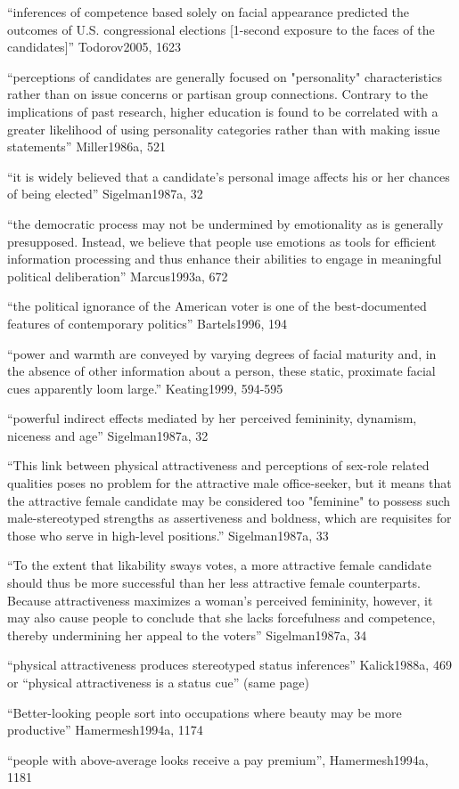 

``inferences of competence based solely on facial appearance predicted the outcomes of U.S. congressional elections [1-second exposure to the faces of the candidates]'' Todorov2005, 1623

``perceptions of candidates are generally focused on "personality" characteristics rather than on issue concerns or partisan group connections. Contrary to the implications of past research, higher education is found to be correlated with a greater likelihood of using personality categories rather than with making issue statements'' Miller1986a, 521

``it is widely believed that a candidate's personal image affects his or her chances of being elected'' Sigelman1987a, 32

``the democratic process may not be undermined by emotionality as is generally presupposed. Instead, we believe that people use emotions as tools for efficient information processing and thus enhance their abilities to engage in meaningful political deliberation'' Marcus1993a, 672

``the political ignorance of the American voter is one of the best-documented features of contemporary politics'' Bartels1996, 194

``power and warmth are conveyed by varying degrees of facial maturity and, in the absence of other information about a person, these static, proximate facial cues apparently loom large.'' Keating1999, 594-595



``powerful indirect effects mediated by her perceived femininity, dynamism, niceness and age'' Sigelman1987a, 32

``This link between physical attractiveness and perceptions of sex-role related qualities poses no problem for the attractive male office-seeker, but it means that the attractive female candidate may be considered too "feminine" to possess such male-stereotyped strengths as assertiveness and boldness, which are requisites for those who serve in high-level positions.''  Sigelman1987a, 33

``To the extent that likability sways votes, a more attractive female candidate should thus be more successful than her less attractive female counterparts. Because attractiveness maximizes a woman's perceived femininity, however, it may also cause people to conclude that she lacks forcefulness and competence, thereby undermining her appeal to the voters''  Sigelman1987a, 34


``physical attractiveness produces stereotyped status inferences'' Kalick1988a, 469 or ``physical attractiveness is a status cue'' (same page)

``Better-looking people sort into occupations where beauty may be more productive'' Hamermesh1994a, 1174

``people with above-average looks receive a pay premium'', Hamermesh1994a, 1181




